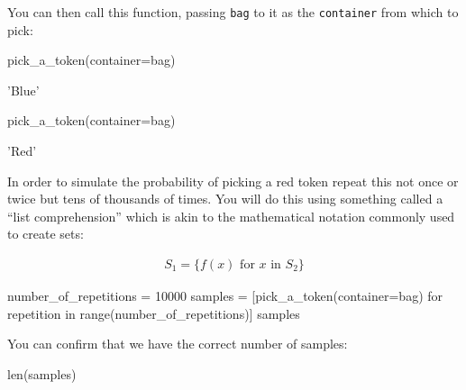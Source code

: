 You can then call this function, passing \texttt{bag} to it as the \texttt{container} from
which to pick:

\begin{pyin}
pick_a_token(container=bag)
\end{pyin}





\begin{raw}
'Blue'
\end{raw}









\begin{pyin}
pick_a_token(container=bag)
\end{pyin}





\begin{raw}
'Red'
\end{raw}






In order to simulate the probability of picking a red token repeat
this not once or twice but tens of thousands of times. You will do this using
something called a ``list comprehension'' which is akin to the mathematical
notation commonly used to create sets:

\begin{equation*}
\begin{split}
    S_1 = \{f(x)\text{ for }x\text{ in }S_2\}
\end{split}
\end{equation*}

\begin{pyin}
number_of_repetitions = 10000
samples = [pick_a_token(container=bag) for repetition in range(number_of_repetitions)]
samples
\end{pyin}





\begin{pyin}
\end{pyin}

You can confirm that we have the correct number of samples:

\begin{pyin}
len(samples)
\end{pyin}

